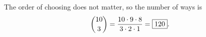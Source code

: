 The order of choosing does not matter, so the number of ways is
\[\dbinom{10}{3}=\dfrac{10\cdot9\cdot8}{3\cdot2\cdot1}=\boxed{120}.\]
